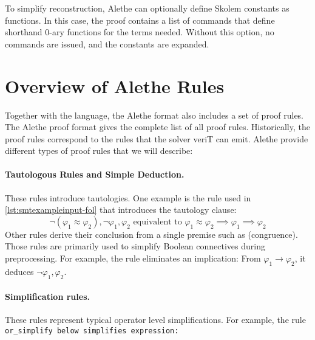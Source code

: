 To simplify reconstruction, Alethe can optionally define Skolem constants as functions. In this case, the proof contains a list of
 commands that define shorthand $0$-ary functions for the  terms
needed. Without this option, no  commands are issued, and the constants are expanded.

\section{Overview of Alethe Rules}

Together with the language, the Alethe format also includes a set of proof rules.
The Alethe proof format \cite[\S 5]{alethespec} gives the complete list of all proof rules.
Historically, the proof rules correspond to the rules that the solver veriT can emit.
Alethe provide different types of proof rules that we will describe:

\paragraph{Tautologous Rules and Simple Deduction.}
These rules introduce tautologies. One example is the  rule used in \cref{lst:smtexampleinput-fol} that introduces the tautology clause:
\[
  \neg (\varphi_1 \approx \varphi_2), \neg \varphi_1, \varphi_2 \text{ equivalent to } \varphi_1 \approx \varphi_2 \implies  \varphi_1 \implies \varphi_2
\]
%
Other rules derive their conclusion from a single premise such as  (congruence).
%
Those rules are primarily used to simplify Boolean connectives during preprocessing.
For example, the  rule eliminates an implication: From $\varphi_1 \to \varphi_2$, it deduces $\neg \varphi_1, \varphi_2$.

\paragraph{Simplification rules.} These rules represent typical operator level simplifications.
For example, the rule \tt{or\_simplify} below simplifies  expression:

